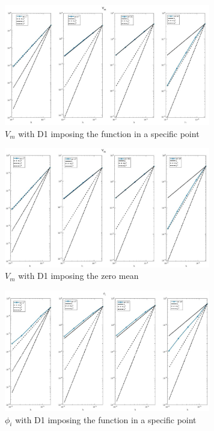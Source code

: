 \documentclass[a4paper,11pt]{article}
\begin{document}
\begin{figure}[h] \captionsetup{size = large} \caption{Comparison between the uniqueness imposition strategies} \label{uniqueness_plot}
\begin{subfigure}{0.5\textwidth}
\includegraphics[width = 9cm]{./D1_Vm_1.jpg}
\caption*{$V_m$ with D1 imposing the function in a specific point}
\label{Vm_1}
\end{subfigure}
\begin{subfigure}{0.5\textwidth}
\includegraphics[width =9cm]{./D1_Vm_2.jpg}
\caption*{$V_m$ with D1 imposing the zero mean}
\label{Vm_2}
\end{subfigure}
\begin{subfigure}{0.5\textwidth}
\includegraphics[width = 9cm]{./D1_Phii_1.jpg}
\caption*{$\phi_i$ with D1 imposing the function in a specific point}
\label{Phii_1}
\end{subfigure}
\begin{subfigure}{0.5\textwidth}

\end{subfigure}
\end{figure}
\end{document}
